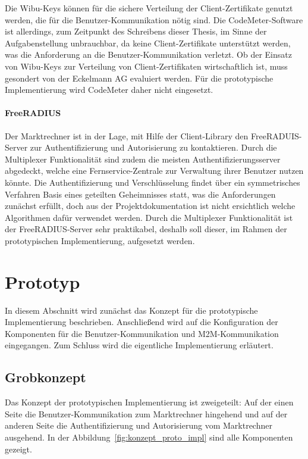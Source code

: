 \documentclass[11pt,a4paper]{report}
\begin{document}
Die Wibu-Keys können für die sichere Verteilung der Client-Zertifikate genutzt werden, die für die Benutzer-Kommunikation nötig sind. Die CodeMeter-Software ist allerdings, zum Zeitpunkt des Schreibens dieser Thesis, im Sinne der Aufgabenstellung unbrauchbar, da keine Client-Zertifikate unterstützt werden, was die Anforderung an die Benutzer-Kommunikation verletzt. Ob der Einsatz von Wibu-Keys zur Verteilung von Client-Zertifikaten wirtschaftlich ist, muss gesondert von der Eckelmann AG evaluiert werden. Für die prototypische Implementierung wird CodeMeter daher nicht eingesetzt.

\paragraph{FreeRADIUS}

Der Marktrechner ist in der Lage, mit Hilfe der Client-Library den FreeRADUIS-Server zur Authentifizierung und Autorisierung zu kontaktieren. Durch die Multiplexer Funktionalität sind zudem die meisten Authentifizierungsserver abgedeckt, welche eine Fernservice-Zentrale zur Verwaltung ihrer Benutzer nutzen könnte. Die Authentifizierung und Verschlüsselung findet über ein symmetrisches Verfahren Basis eines geteilten Geheimnisses statt, was die Anforderungen zunächst erfüllt, doch aus der Projektdokumentation ist nicht ersichtlich welche Algorithmen dafür verwendet werden. Durch die Multiplexer Funktionalität ist der FreeRADIUS-Server sehr praktikabel, deshalb soll dieser, im Rahmen der prototypischen Implementierung, aufgesetzt werden.

\section{Prototyp}

In diesem Abschnitt wird zunächst das Konzept für die prototypische Implementierung beschrieben. Anschließend wird auf die Konfiguration der Komponenten für die Benutzer-Kommunikation und M2M-Kommunikation eingegangen. Zum Schluss wird die eigentliche Implementierung erläutert.

\subsection{Grobkonzept}

Das Konzept der prototypischen Implementierung ist zweigeteilt: Auf der einen Seite die Benutzer-Kommunikation zum Marktrechner hingehend und auf der anderen Seite die Authentifizierung und Autorisierung vom Marktrechner ausgehend. In der Abbildung~\ref{fig:konzept_proto_impl} sind alle Komponenten gezeigt.
\end{document}

